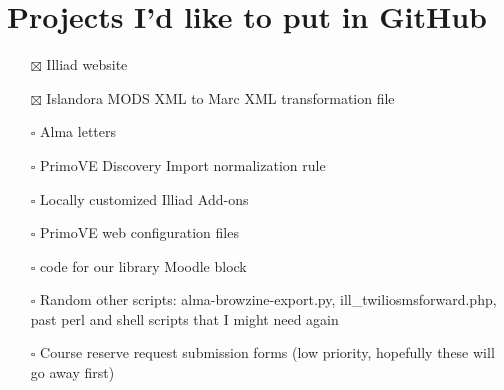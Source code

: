 \documentclass[
  openany]{book}
\providecommand{\tightlist}{%
  \setlength{\itemsep}{0pt}\setlength{\parskip}{0pt}}
\begin{document}
\hypertarget{projects-id-like-to-put-in-github}{%
\chapter{Projects I'd like to put in GitHub}\label{projects-id-like-to-put-in-github}}

\begin{itemize}
\tightlist
\item[$\boxtimes$]
  Illiad website
\item[$\boxtimes$]
  Islandora MODS XML to Marc XML transformation file
\item[$\square$]
  Alma letters
\item[$\square$]
  PrimoVE Discovery Import normalization rule
\item[$\square$]
  Locally customized Illiad Add-ons
\item[$\square$]
  PrimoVE web configuration files
\item[$\square$]
  code for our library Moodle block
\item[$\square$]
  Random other scripts: alma-browzine-export.py, ill\_twiliosmsforward.php, past perl and shell scripts that I might need again
\item[$\square$]
  Course reserve request submission forms (low priority, hopefully these will go away first)
\end{itemize}
\end{document}
